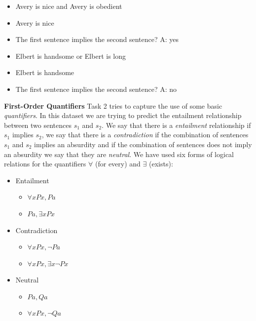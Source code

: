 \vspace{0.3cm}


\begin{itemize} 
\item[]Avery is nice and Avery is obedient
\item[]Avery is nice
\item[]The first sentence implies the second sentence? A: yes
\end{itemize}

\vspace{0.3cm}

\begin{itemize} 
\item[]Elbert is handsome or Elbert is long
\item[]Elbert is handsome
\item[]The first sentence implies the second sentence? A: no
\end{itemize}

\textbf{First-Order Quantifiers} Task 2 tries to capture the use of some basic \textit{quantifiers}. In this dataset we are trying to predict the entailment relationship between two sentences $s_1$ and $s_2$. We say that there is a \textit{entailment} relationship if $s_1$ implies $s_2$, we say that there is a \textit{contradiction} if the combination of sentences $s_1$ and $s_2$ implies an absurdity and if the combination of sentences does not imply an absurdity we say that they are \textit{neutral}. We have used six forms of logical relations for the quantifiers $\forall$ (for every) and $\exists$ (exists):

\begin{itemize}
\item Entailment
\begin{itemize}
\item $\forall x Px, Pa$ 
\item $Pa, \exists x Px$ 
\end{itemize}
\item Contradiction
\begin{itemize}
\item $\forall x Px, \lnot Pa$ 
\item $\forall x Px, \exists x \lnot Px$ 
\end{itemize}
\item Neutral
\begin{itemize}
\item $Pa,Qa$
\item $\forall x Px, \lnot Qa$ 
\end{itemize}
\end{itemize}

